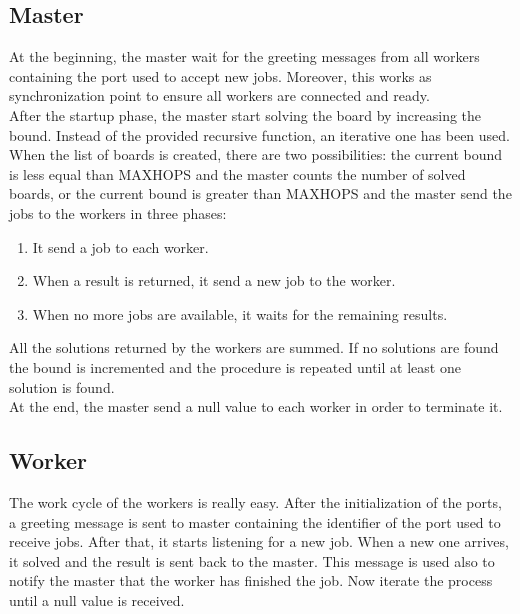 \documentclass{article}
\begin{document}
\subsection{Master} \label{sec:master}
At the beginning, the master wait for the greeting messages from all workers containing the port used to accept new jobs. Moreover, this works as synchronization point to ensure all workers are connected and ready. \\
After the startup phase, the master start solving the board by increasing the bound. Instead of the provided recursive function, an iterative one has been used. When the list of boards is created, there are two possibilities: the current bound is less equal than MAXHOPS and the master counts the number of solved boards, or the current bound is greater than MAXHOPS and the master send the jobs to the workers in three phases:
\begin{enumerate}
    \item It send a job to each worker.
    \item When a result is returned, it send a new job to the worker.
    \item When no more jobs are available, it waits for the remaining results.
\end{enumerate}
All the solutions returned by the workers are summed. If no solutions are found the bound is incremented and the procedure is repeated until at least one solution is found. \\
At the end, the master send a null value to each worker in order to terminate it.


\subsection{Worker}
The work cycle of the workers is really easy. After the initialization of the ports, a greeting message is sent to master containing the identifier of the port used to receive jobs. After that, it starts listening for a new job. When a new one arrives, it solved and the result is sent back to the master. This message is used also to notify the master that the worker has finished the job. Now iterate the process until a null value is received.
\end{document}

